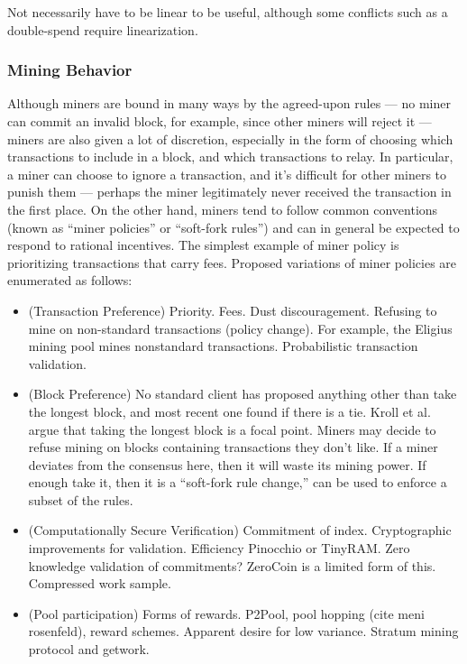 Not necessarily have to be linear to be useful, although some conflicts such as a double-spend require linearization.

\subsubsection{Mining Behavior}
Although miners are bound in many ways by the agreed-upon rules --- no miner can commit an invalid block, for example, since other miners will reject it --- miners are also given a lot of discretion, especially in the form of choosing which transactions to include in a block, and which transactions to relay. In particular, a miner can choose to ignore a transaction, and it's difficult for other miners to punish them --- perhaps the miner legitimately never received the transaction in the first place. On the other hand, miners tend to follow common conventions (known as ``miner policies'' or ``soft-fork rules'') and can in general be expected to respond to rational incentives. The simplest example of miner policy is prioritizing transactions that carry fees. Proposed variations of miner policies are enumerated as follows:
\begin{itemize}
\item (Transaction Preference) Priority. Fees. Dust discouragement. Refusing to mine on non-standard transactions (policy change). For example, the Eligius mining pool mines nonstandard transactions. Probabilistic transaction validation.
\item (Block Preference) No standard client has proposed anything other than take the longest block, and most recent one found if there is a tie. Kroll et al. argue that taking the longest block is a focal point. Miners may decide to refuse mining on blocks containing transactions they don't like. If a miner deviates from the consensus here, then it will waste its mining power. If enough take it, then it is a ``soft-fork rule change,'' can be used to enforce a subset of the rules. 
\item (Computationally Secure Verification) Commitment of index. Cryptographic improvements for validation. Efficiency Pinocchio or TinyRAM. Zero knowledge validation of commitments? ZeroCoin is a limited form of this. Compressed work sample.
\item (Pool participation) Forms of rewards. P2Pool, pool hopping (cite meni rosenfeld), reward schemes. Apparent desire for low variance. Stratum mining protocol and getwork.
\end{itemize}

